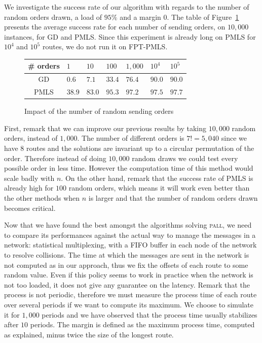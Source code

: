 \documentclass[10pt, conference, letterpaper]{IEEEtran}
\newcommand{\todo}[1]{{\color{red} TODO: {#1}}}
\newcommand\pall{\textsc{pall}\xspace}
\begin{document}
    We investigate the success rate of our algorithm with regards to the number of random orders drawn, a load of $95\%$ and a margin $0$. The table of Figure~\ref{fig:randomdrawing} presents the average success rate for each number of sending orders, on $10,000$ instances, for GD and PMLS. Since this experiment is already long on PMLS for $10^{4}$ and $10^{5}$ routes, we do not run it on FPT-PMLS.
         \begin{figure}[h] 
       \begin{center}
   \begin{tabularx}{0.5\textwidth}{|c|X|X|X|X|X|X|}
    \hline
    \# orders& $1$ & $10$ & $100$& $1,000$& $10^{4}$&$10^{5}$\\
    \hline
    GD & $0.6$ &$7.1$&$33.4$&$76.4$&$90.0$&$90.0$\\
    \hline
  PMLS & $38.9$ &$83.0$&$95.3$&$97.2$&$97.5$&$97.7$\\
    \hline
      \end{tabularx}
      \end{center}
   \caption{Impact of the number of random sending orders}
        \label{fig:randomdrawing}
     \end{figure}
     
     
First, remark that we can improve our previous results by taking $10,000$ random orders,
instead of $1,000$. The number of different orders is $7!= 5,040$ since we have $8$ routes and the solutions are invariant up to a circular permutation of the order. Therefore instead of doing $10,000$ random draws we could test every possible order in less time. However the computation time of this method would scale badly with $n$. On the other hand, remark that the success rate of PMLS is already high for $100$ random orders, which means it will work even better than the other methods when $n$ is larger and that the number of random orders drawn becomes critical.
     
     Now that we have found the best amongst the algorithms solving \pall, we need to compare its performances against the actual way to manage the messages in a network:  statistical multiplexing, with a FIFO buffer in each node of the network to resolve collisions. The time at which the messages are sent in the network is not computed as in our approach, thus we fix the offsets of each route to some random value.
     Even if this policy seems to work in practice when the network is not too loaded, it does not give any guarantee on the latency. Remark that the process is not periodic, therefore we must measure the process time of each route over several periods if we want to compute its maximum. We choose to simulate it for $1,000$ periods and we have observed that the process time usually stabilizes after $10$ periods. The margin is defined as the maximum process time, computed as explained, minus twice the size of the longest route. 
	    
\end{document}
